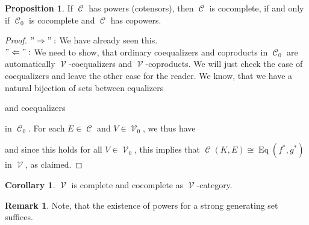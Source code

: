 \documentclass[a4paper,11pt,oneside,openany]{scrbook}
\newcommand{\iso}{\cong}
\DeclareMathOperator{\V}{\mathcal{V}}
\DeclareMathOperator{\C}{\mathcal{C}}
\DeclareMathOperator{\Eq}{Eq}
\theoremstyle{definition}
\theoremstyle{definition}
\newtheorem{prop}[thm]{Proposition}
\newtheorem{cor}[thm]{Corollary}
\newtheorem{rmk}[thm]{Remark}
\begin{document}
\begin{prop}
   If $\C$ has powers (cotensors), then $\C$ is cocomplete, if and only if $\C_{0}$ is cocomplete and $\C$ has copowers.
\end{prop}

\begin{proof}
   $"\Rightarrow ":$ We have already seen this. \\
   $"\Leftarrow ":$ We need to show, that ordinary coequalizers and coproducts in $\C_{0}$ are automatically $\V$-coequalizers and $\V$-coproducts. 
   We will just check the case of coequalizers and leave the other case for the reader. We know, that we have a natural bijection of sets between 
   equalizers 
      \begin{center}
      \end{center}
   and coequalizers 
      \begin{center}
      \end{center}
   in $\C_{0}$. For each $E \in \C$ and $V \in \V_{0}$, we thus have 
      \begin{center}
      \end{center}
   and since this holds for all $V \in \V_{0}$, this implies that $\C(K,E) \iso \Eq(f^{\ast},g^{\ast})$ in $\V$, as claimed.
\end{proof}

\begin{cor}
   $\V$ is complete and cocomplete as $\V$-category.
\end{cor}

\begin{rmk}
   Note, that the existence of powers for a strong generating set suffices. 
\end{rmk}
\end{document}
